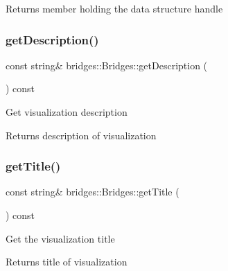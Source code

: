 \begin{DoxyReturn}{Returns}
member holding the data structure handle 
\end{DoxyReturn}
\mbox{\label{classbridges_1_1_bridges_ae9f238e1d9fc421c6c08aacb74e0ef6c}} 
\subsubsection{\texorpdfstring{get\+Description()}{getDescription()}}
{\footnotesize\ttfamily const string\& bridges\+::\+Bridges\+::get\+Description (\begin{DoxyParamCaption}{ }\end{DoxyParamCaption}) const\hspace{0.3cm}{\ttfamily [inline]}}

Get visualization description \begin{DoxyReturn}{Returns}
description of visualization 
\end{DoxyReturn}
\mbox{\label{classbridges_1_1_bridges_a8fe8c79b0f852c0049a699c801e40a61}} 
\subsubsection{\texorpdfstring{get\+Title()}{getTitle()}}
{\footnotesize\ttfamily const string\& bridges\+::\+Bridges\+::get\+Title (\begin{DoxyParamCaption}{ }\end{DoxyParamCaption}) const\hspace{0.3cm}{\ttfamily [inline]}}

Get the visualization title

\begin{DoxyReturn}{Returns}
title of visualization 
\end{DoxyReturn}
\mbox{\label{classbridges_1_1_bridges_ad16be2d94936fd555bc05f58c8c21f50}} 
